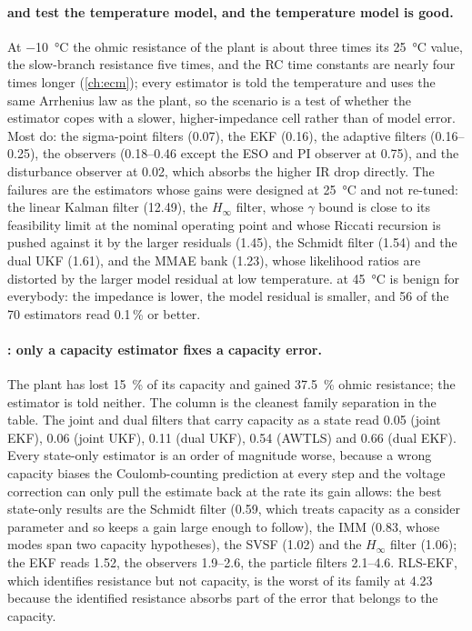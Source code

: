 \paragraph{ and  test the temperature model, and the temperature model is good.}
At \SI{-10}{\celsius} the ohmic resistance of the plant is about three times its
\SI{25}{\celsius} value, the slow-branch resistance five times, and the RC time constants
are nearly four times longer (\cref{ch:ecm}); every estimator is
told the temperature and uses the same Arrhenius law as the plant, so the scenario is a test of
whether the estimator copes with a slower, higher-impedance cell rather than of model error.
Most do: the sigma-point filters (\num{0.07}), the EKF (\num{0.16}), the adaptive filters
(\num{0.16}--\num{0.25}), the observers (\num{0.18}--\num{0.46} except the ESO and PI observer
at \num{0.75}), and the disturbance observer at \num{0.02}, which absorbs the higher IR drop
directly. The failures are the estimators whose gains were designed at \SI{25}{\celsius} and
not re-tuned: the linear Kalman filter (\num{12.49}), the $H_\infty$ filter, whose $\gamma$
bound is close to its feasibility limit at the nominal operating point and whose Riccati
recursion is pushed against it by the larger residuals (\num{1.45}), the Schmidt filter
(\num{1.54}) and the dual UKF (\num{1.61}), and the MMAE bank (\num{1.23}), whose
likelihood ratios are distorted by the larger model residual at low temperature. 
at \SI{45}{\celsius} is benign for everybody: the impedance is lower, the model residual is
smaller, and 56 of the 70 estimators read \num{0.1}\,\% or better.

\paragraph{: only a capacity estimator fixes a capacity error.}
The plant has lost \SI{15}{\percent} of its capacity and gained \SI{37.5}{\percent} ohmic
resistance; the estimator is told neither. The column is the cleanest family separation in the
table. The joint and dual filters that carry capacity as a state read \num{0.05} (joint EKF),
\num{0.06} (joint UKF), \num{0.11} (dual UKF), \num{0.54} (AWTLS) and \num{0.66} (dual EKF).
Every state-only estimator is an order of magnitude worse, because a wrong capacity biases
the Coulomb-counting prediction at every step and the voltage correction can only pull the
estimate back at the rate its gain allows: the best state-only results are the Schmidt filter
(\num{0.59}, which treats capacity as a consider parameter and so keeps a gain large enough to
follow), the IMM (\num{0.83}, whose modes span two capacity hypotheses), the SVSF (\num{1.02})
and the $H_\infty$ filter (\num{1.06}); the EKF reads \num{1.52}, the observers
\num{1.9}--\num{2.6}, the particle filters \num{2.1}--\num{4.6}. RLS-EKF, which identifies
resistance but not capacity, is the worst of its family at \num{4.23} because the identified
resistance absorbs part of the error that belongs to the capacity.

